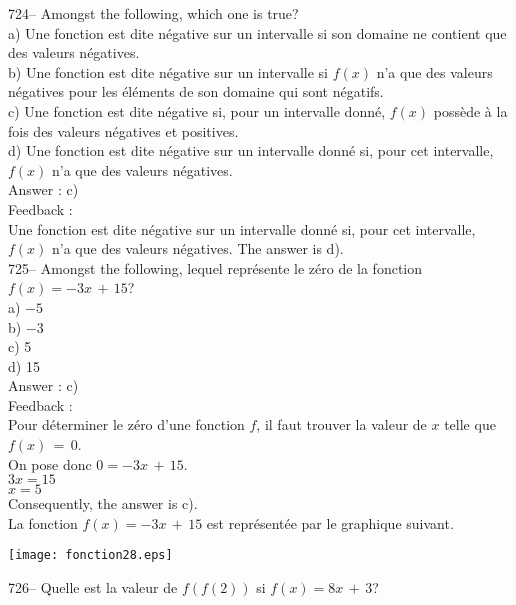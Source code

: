 ﻿\documentclass[letterpaper, 12pt]{article}
\begin{document}
724-- Amongst the following, which one is true?\\
a) Une fonction est dite n\'egative sur un intervalle si son domaine ne
contient que des valeurs n\'egatives.\\
b) Une fonction est dite n\'egative sur un intervalle si $f(x)$ n'a que des
valeurs n\'egatives pour les \'el\'ements de son domaine qui sont
n\'egatifs.\\
c) Une fonction est dite n\'egative si, pour un intervalle donn\'e, $f(x)$
poss\`ede \`a la fois des valeurs n\'egatives et positives.  \\
d) Une fonction est dite n\'egative sur un intervalle donn\'e si, pour cet
intervalle, $f(x)$ n'a que des valeurs n\'egatives.  \\

Answer : c)\\

Feedback : \\
Une fonction est dite n\'egative sur un intervalle donn\'e si, pour cet
intervalle, $f(x)$ n'a que des valeurs n\'egatives.  The answer is d).\\

725-- Amongst the following, lequel repr\'esente le z\'ero de la
fonction $f(x)=-3x\,+\,15$?\\
a) $-5$\\
b) $-3$\\
c) 5\\
d) 15\\

Answer : c)\\

Feedback : \\
Pour d\'eterminer le z\'ero d'une fonction $f$, il faut trouver la valeur de
$x$ telle que $f(x)\,=\,0$.\\
On pose donc $0=-3x\,+\,15$.\\
$3x=15$\\
$x=5$\\
Consequently, the answer is c).\\
La fonction $f(x)=-3x\,+\,15$ est repr\'esent\'ee par le graphique
suivant.\\
    \begin{center}
    \texttt{[image: fonction28.eps]}
    \end{center}

726-- Quelle est la valeur de $f(f(2))$ si $f(x)=8x\,+\,3$?\\
\end{document}
